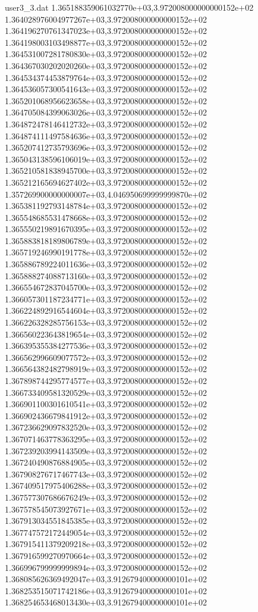 \begin{filecontents}{user3_3.dat}
1.365188359061032770e+03,3.972008000000000152e+02
1.364028976004977267e+03,3.972008000000000152e+02
1.364196270761347023e+03,3.972008000000000152e+02
1.364198003103498877e+03,3.972008000000000152e+02
1.364531007281780830e+03,3.972008000000000152e+02
1.364367030202020260e+03,3.972008000000000152e+02
1.364534374453879764e+03,3.972008000000000152e+02
1.364536057300541643e+03,3.972008000000000152e+02
1.365201068956623658e+03,3.972008000000000152e+02
1.364705084399063026e+03,3.972008000000000152e+02
1.364872478146412732e+03,3.972008000000000152e+02
1.364874111497584636e+03,3.972008000000000152e+02
1.365207412735793696e+03,3.972008000000000152e+02
1.365043138596106019e+03,3.972008000000000152e+02
1.365210581838945700e+03,3.972008000000000152e+02
1.365212165694627402e+03,3.972008000000000152e+02
1.357269900000000007e+03,4.046950699999999870e+02
1.365381192793148784e+03,3.972008000000000152e+02
1.365548685531478668e+03,3.972008000000000152e+02
1.365550219891670395e+03,3.972008000000000152e+02
1.365883818189806789e+03,3.972008000000000152e+02
1.365719246990191778e+03,3.972008000000000152e+02
1.365886789224011636e+03,3.972008000000000152e+02
1.365888274088713160e+03,3.972008000000000152e+02
1.366554672837045700e+03,3.972008000000000152e+02
1.366057301187234771e+03,3.972008000000000152e+02
1.366224892916544604e+03,3.972008000000000152e+02
1.366226328285756153e+03,3.972008000000000152e+02
1.366560223643819654e+03,3.972008000000000152e+02
1.366395355384277536e+03,3.972008000000000152e+02
1.366562996609077572e+03,3.972008000000000152e+02
1.366564382482798919e+03,3.972008000000000152e+02
1.367898744295774577e+03,3.972008000000000152e+02
1.366733409581320529e+03,3.972008000000000152e+02
1.366901100301610541e+03,3.972008000000000152e+02
1.366902436679841912e+03,3.972008000000000152e+02
1.367236629097832520e+03,3.972008000000000152e+02
1.367071463778363295e+03,3.972008000000000152e+02
1.367239203994143509e+03,3.972008000000000152e+02
1.367240490876884905e+03,3.972008000000000152e+02
1.367908276717467743e+03,3.972008000000000152e+02
1.367409517975406288e+03,3.972008000000000152e+02
1.367577307686676249e+03,3.972008000000000152e+02
1.367578545073927671e+03,3.972008000000000152e+02
1.367913034551845385e+03,3.972008000000000152e+02
1.367747572172449054e+03,3.972008000000000152e+02
1.367915411379209218e+03,3.972008000000000152e+02
1.367916599270970664e+03,3.972008000000000152e+02
1.366996799999999894e+03,3.972008000000000152e+02
1.368085626369492047e+03,3.912679400000000101e+02
1.368253515071742186e+03,3.912679400000000101e+02
1.368254653468013430e+03,3.912679400000000101e+02

\end{filecontents}
